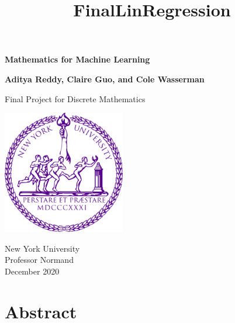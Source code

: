 \documentclass{article}
\title{FinalLinRegression}
\begin{document}
\begin{titlepage}
   \begin{center}
       \vspace*{1cm}

       \huge \textbf{Mathematics for Machine Learning}

       \vspace{0.5cm}
        
            
       \vspace{1.5cm}

      
      \large \textbf{Aditya Reddy, Claire Guo, and Cole Wasserman}

      \vspace{35 mm}
            
       Final Project for Discrete Mathematics\\
            
       \vspace{0.8cm}
     
       \includegraphics[width=0.4\textwidth]{university}
        \vspace{20 mm}     
       
       New York University\\
       Professor Normand\\
       December 2020\
            
   \end{center}
\end{titlepage}

\pagestyle{fancy}
\fancyhf{}
\tableofcontents
\newpage

\section{Abstract}
\end{document}
